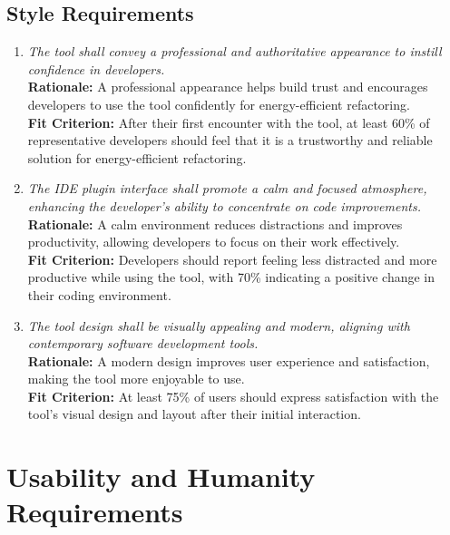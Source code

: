 \documentclass[12pt]{article}
\begin{document}
\subsection{Style Requirements}
\begin{enumerate}[label=LFR-ST \arabic*., wide=0pt, leftmargin=*]
    \item \emph{The tool shall convey a professional and authoritative appearance to instill confidence in developers.}\\
    {\bf Rationale:} A professional appearance helps build trust and encourages developers to use the tool confidently for energy-efficient refactoring.\\
    {\bf Fit Criterion:} After their first encounter with the tool, at least 60\% of representative developers should feel that it is a trustworthy and reliable solution for energy-efficient refactoring.
    \item \emph{The IDE plugin interface shall promote a calm and focused atmosphere, enhancing the developer's ability to concentrate on code improvements.}\\
    {\bf Rationale:} A calm environment reduces distractions and improves productivity, allowing developers to focus on their work effectively.\\
    {\bf Fit Criterion:} Developers should report feeling less distracted and more productive while using the tool, with 70\% indicating a positive change in their coding environment.
    \item \emph{The tool design shall be visually appealing and modern, aligning with contemporary software development tools.}\\
    {\bf Rationale:} A modern design improves user experience and satisfaction, making the tool more enjoyable to use.\\
    {\bf Fit Criterion:} At least 75\% of users should express satisfaction with the tool's visual design and layout after their initial interaction.
\end{enumerate}

\section{Usability and Humanity Requirements}
\end{document}
